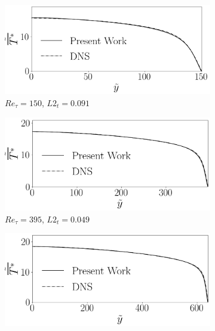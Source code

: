 \documentclass[10pt]{article} %
\begin{document}
\begin{figure}[!h]
	\centering
	\begin{subfigure}[t]{0.5\textwidth}
		\centering
		\includegraphics[angle=0, scale=0.24]{fotos_formatacao_final/Temperature_150_071_Genetic2temperature}
		\caption{$Re_\tau = 150$, $L2_t = 0.091$}
	\end{subfigure}
	\begin{subfigure}[t]{0.45\textwidth}
		\centering
		\includegraphics[angle=0, scale=0.24]{fotos_formatacao_final/Temperature_395_071_Genetic2temperature}
		\caption{$Re_\tau = 395$, $L2_t = 0.049$}
	\end{subfigure}
	\begin{subfigure}[t]{0.5\textwidth}
		\centering
		\includegraphics[angle=0, scale=0.24]{fotos_formatacao_final/Temperature_640_071_Genetic2temperature}

\end{subfigure}
\end{figure}
\end{document}
